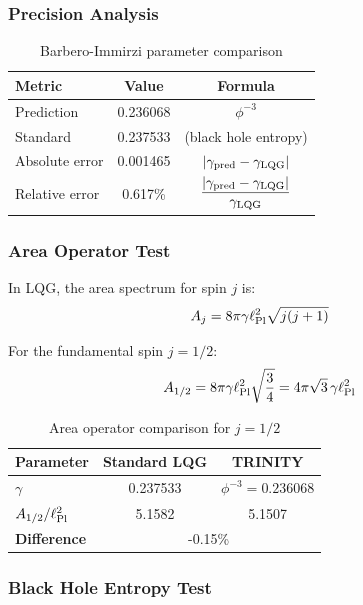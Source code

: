 \documentclass[12pt,a4paper]{article}
\begin{document}
\subsubsection{Precision Analysis}

\begin{table}[h]
\centering
\begin{tabular}{lcc}
\toprule
\textbf{Metric} & \textbf{Value} & \textbf{Formula} \\
\midrule
Prediction & 0.236068 & $\phi^{-3}$ \\
Standard & 0.237533 & (black hole entropy) \\
Absolute error & 0.001465 & $|\gamma_{\rm pred} - \gamma_{\rm LQG}|$ \\
Relative error & 0.617\% & $\dfrac{|\gamma_{\rm pred} - \gamma_{\rm LQG}|}{\gamma_{\rm LQG}}$ \\
\bottomrule
\end{tabular}
\caption{Barbero-Immirzi parameter comparison}
\end{table}

\subsubsection{Area Operator Test}

In LQG, the area spectrum for spin $j$ is:
\begin{equation}
A_j = 8\pi\gamma\ell_{\rm Pl}^2\sqrt{j(j+1)}
\end{equation}

For the fundamental spin $j = 1/2$:
\begin{equation}
A_{1/2} = 8\pi\gamma\ell_{\rm Pl}^2\sqrt{\frac{3}{4}} = 4\pi\sqrt{3}\,\gamma\ell_{\rm Pl}^2
\end{equation}

\begin{table}[h]
\centering
\begin{tabular}{lcc}
\toprule
\textbf{Parameter} & \textbf{Standard LQG} & \textbf{TRINITY} \\
\midrule
$\gamma$ & 0.237533 & $\phi^{-3} = 0.236068$ \\
$A_{1/2}/\ell_{\rm Pl}^2$ & 5.1582 & 5.1507 \\
\midrule
\textbf{Difference} & \multicolumn{2}{c}{-0.15\%} \\
\bottomrule
\end{tabular}
\caption{Area operator comparison for $j=1/2$}
\end{table}

\subsubsection{Black Hole Entropy Test}
\end{document}
